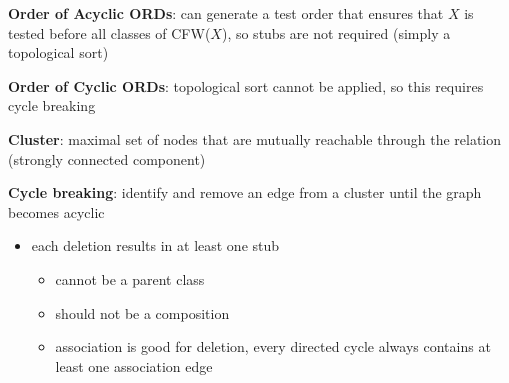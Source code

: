 \documentclass[11pt]{article}
\begin{document}
\textbf{Order of Acyclic ORDs}:
can generate a test order that ensures that \(X\) is tested before all classes
of CFW(\(X\)), so stubs are not required (simply a topological sort)

\textbf{Order of Cyclic ORDs}:
topological sort cannot be applied, so this requires cycle breaking

\textbf{Cluster}: maximal set of nodes that are mutually reachable through the relation
(strongly connected component)

\textbf{Cycle breaking}: identify and remove an edge from a cluster until the graph
becomes acyclic
\begin{itemize}
\item each deletion results in at least one stub
\begin{itemize}
\item cannot be a parent class
\item should not be a composition
\item association is good for deletion, every directed cycle always contains
at least one association edge
\end{itemize}
\end{itemize}
\end{document}
